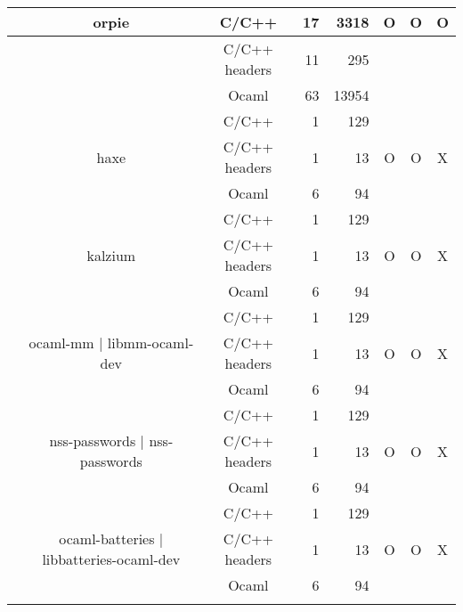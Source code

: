 \documentclass[11pt,a4paper]{article}
\begin{document}
 \begin{table}[h,t] 
\begin{tabular}{|>{\centering}m{3cm}| c|c|r|r| c| c|c|}

\hline


  \multirow{18}{3cm}{packages written in OCaml} & \multirow{3}{*}{orpie} & C/C++ & 17 & 3318 & \multirow{3}{*}{O} & \multirow{3}{*}{O} & \multirow{3}{*}{O}\\
 \cline{3-5}
 &  &                           C/C++ headers & 11 & 295 & & & \\
 \cline{3-5}
 & &                           Ocaml & 63 & 13954 & & & \\
 \cline{2-8}

 &\multirow{3}{3cm}{haxe} & C/C++ & 1 & 129 & \multirow{3}{*}{O} & \multirow{3}{*}{O} & \multirow{3}{*}{X}\\
\cline{3-5}
& &                           C/C++ headers & 1 & 13 & & & \\
\cline{3-5}
& &                          Ocaml & 6 & 94 & & & \\
\cline{2-8}


 &\multirow{3}{3cm}{kalzium} & C/C++ & 1 & 129 & \multirow{3}{*}{O} & \multirow{3}{*}{O} & \multirow{3}{*}{X}\\
\cline{3-5}
& &                           C/C++ headers & 1 & 13 & & & \\
\cline{3-5}
& &                          Ocaml & 6 & 94 & & & \\
\cline{2-8}

 &\multirow{3}{3cm}{ocaml-mm | libmm-ocaml-dev} & C/C++ & 1 & 129 & \multirow{3}{*}{O} & \multirow{3}{*}{O} & \multirow{3}{*}{X}\\
\cline{3-5}
& &                           C/C++ headers & 1 & 13 & & & \\
\cline{3-5}
& &                          Ocaml & 6 & 94 & & & \\
\cline{2-8}


 &\multirow{3}{3cm}{nss-passwords | nss-passwords} & C/C++ & 1 & 129 & \multirow{3}{*}{O} & \multirow{3}{*}{O} & \multirow{3}{*}{X}\\
\cline{3-5}
& &                           C/C++ headers & 1 & 13 & & & \\
\cline{3-5}
& &                          Ocaml & 6 & 94 & & & \\
\cline{2-8}
 &\multirow{3}{3cm}{ocaml-batteries | libbatteries-ocaml-dev} & C/C++ & 1 & 129 & \multirow{3}{*}{O} & \multirow{3}{*}{O} & \multirow{3}{*}{X}\\
\cline{3-5}
& &                           C/C++ headers & 1 & 13 & & & \\
\cline{3-5}
& &                          Ocaml & 6 & 94 & & & \\
\cline{2-8}






\end{tabular}
\end{table}
\end{document}
